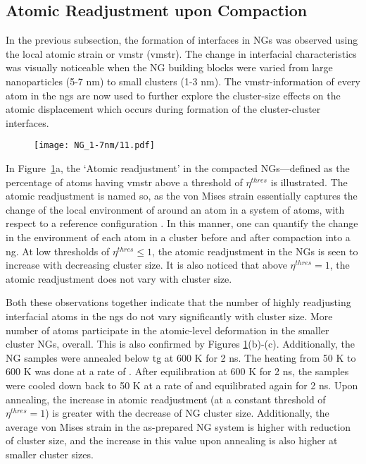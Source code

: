 \subsection{Atomic Readjustment upon Compaction}
In the previous subsection, the formation of interfaces in NGs was observed using the local atomic strain or \glsdesc{vmstr} (\gls{vmstr}). The change in interfacial characteristics was visually noticeable when the NG building blocks were varied from large nanoparticles (5-7 nm) to small clusters (1-3 nm). The \glsdesc{vmstr}-information of every atom in the \glspl{ng} are now used to further explore the cluster-size effects on the atomic displacement which occurs during formation of the cluster-cluster interfaces. \par

\begin{figure}[!h]
	\texttt{[image: NG\_1-7nm/11.pdf]}
	\label{f:NGvonMises}
\end{figure}

In Figure~\ref{f:NGvonMises}a, the `Atomic readjustment' in the compacted NGs---defined as the percentage of atoms having \gls{vmstr} above a threshold of $\eta^{thres}$ is illustrated. The atomic readjustment is named so, as the von Mises strain essentially captures the change of the local environment of around an atom in a system of atoms, with respect to a reference configuration \cite{Adjaoud2018,Cheng2019,Zheng2021,Cheng2009}. In this manner, one can quantify the change in the environment of each atom in a cluster before and after compaction into a \gls{ng}. At low thresholds of $\eta^{thres} \leq 1$, the atomic readjustment in the NGs is seen to increase with decreasing cluster size. It is also noticed that above $\eta^{thres} = 1$, the atomic readjustment does not vary with cluster size. \par

Both these observations together indicate that the number of highly readjusting interfacial atoms in the \glspl{ng} do not vary significantly with cluster size. More number of atoms participate in the atomic-level deformation in the smaller cluster NGs, overall. This is also confirmed by Figures \mbox{\ref{f:NGvonMises}(b)-(c)}. Additionally, the NG samples were annealed below \gls{tg} at 600 K for 2 ns. The heating from 50 K to 600 K was done at a rate of . After equilibration at 600 K for 2 ns, the samples were cooled down back to 50 K at a rate of  and equilibrated again for 2 ns. Upon annealing, the increase in atomic readjustment (at a constant threshold of $\eta^{thres} = 1$) is greater with the decrease of NG cluster size. Additionally, the average von Mises strain in the as-prepared NG system is higher with reduction of cluster size, and the increase in this value upon annealing is also higher at smaller cluster sizes. \par

